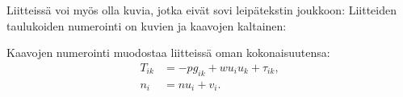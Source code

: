 \documentclass[english, 12pt, a4paper, elec, utf8, a-1b, online]{aaltothesis}
\begin{document}
Liitteiss\"a voi my\"os olla kuvia, jotka
eiv\"at sovi leip\"atekstin joukkoon:
Liitteiden taulukoiden numerointi on kuvien ja kaavojen kaltainen:
\begin{table}[htb]
\caption{Taulukon kuvateksti.}
\label{liitetaulukko}
\begin{center}
\end{center}
\end{table}
Kaavojen numerointi muodostaa liitteiss\"a oman kokonaisuutensa:
\begin{align}
T_{ik} &= -p g_{ik} + w u_i u_k + \tau_{ik},  \label{liitekaava3} \\
n_i    &= n u_i + v_i.                      \label{liitekaava4}
\end{align}
\end{document}
